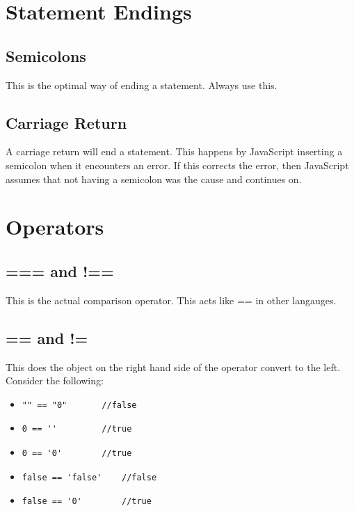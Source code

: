 \documentclass {article}
\begin{document}
\section{Statement Endings}
	\subsection{Semicolons}
		This is the optimal way of ending a statement.  Always use this.
	\subsection {Carriage Return}
		A carriage return will end a statement.  This happens by JavaScript inserting a semicolon when it encounters an error.  If this corrects the error, then JavaScript assumes that not having a semicolon was the cause and continues on. 


\section{Operators}
	\subsection{=== and !==}
		This is the actual comparison operator.  This acts like == in other langauges.
	\subsection{== and !=}
		This does the object on the right hand side of the operator convert to the left.  
		Consider the following: 

		\begin{itemize}
			\item \begin{lstlisting} 
"" == "0" 		//false
				\end{lstlisting} 

			\item \begin{lstlisting} 
0 == '' 		//true
				\end{lstlisting} 

			\item \begin{lstlisting} 
0 == '0' 		//true
				\end{lstlisting} 
		\end{itemize}


		\begin{itemize}
			\item \begin{lstlisting} 
false == 'false' 	//false 
				\end{lstlisting}

			\item \begin{lstlisting} 
false == '0'	 	//true
				\end{lstlisting} 
		\end{itemize}
\end{document}
